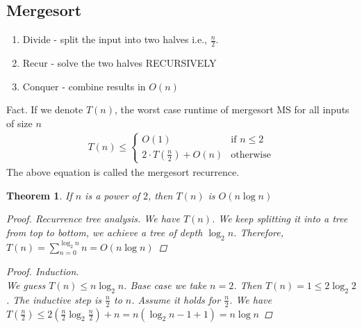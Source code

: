 \documentclass[a4paper]{article}
\theoremstyle{plain}
\newtheorem{thm}{Theorem}[section]
\theoremstyle{definition}
\theoremstyle{remark}
\begin{document}
	\subsection{Mergesort}
	\begin{enumerate}
		\item Divide - split the input into two halves i.e., $\frac{n}{2}$.
		\item Recur - solve the two halves RECURSIVELY
			\item Conquer - combine results in $O(n)$
	\end{enumerate}
	Fact. If we denote $T(n)$, the worst case runtime of mergesort MS for all inputs of size $n$ 
	\begin{align*}
		T(n) \le 
		\begin{cases}
			O(1) & \text{if } n\le 2 \\
			2 \cdot T(\frac{n}{2}) + O(n) & \text{otherwise}
		\end{cases}
	\end{align*}	
	The above equation is called the mergesort recurrence.
	\begin{thm}
		If $n$ is a power of $2$, then $T(n)$ is $O(n \log n)$ 
		\begin{proof}
			Recurrence tree analysis. We have $T(n)$. We keep splitting it into a tree from top to bottom, we achieve a tree of depth $\log_2n$. Therefore, $T(n)=\sum_{n=0}^{\log_2n} n = O(n \log n)$
		\end{proof}
		\begin{proof}
			Induction. \\
			We guess $T(n) \le n \log_2 n$. Base case we take $n=2$. Then $T(n) = 1 \le 2 \log_2 2$. The inductive step is $\frac{n}{2}$ to $n$. Assume it holds for $\frac{n}{2}$. We have $T(\frac{n}{2})\le 2(\frac{n}{2} \log_2 \frac{n}{2})+n = n(\log_2 n -1 + 1) = n \log n$
		\end{proof}
	\end{thm}
\end{document}
